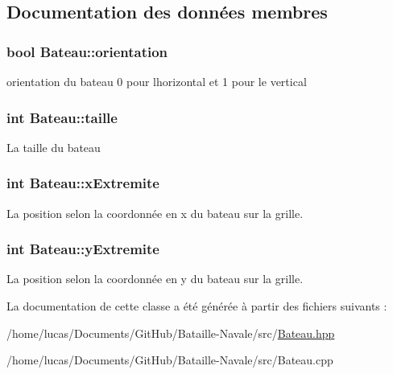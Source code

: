 \subsection{Documentation des données membres}
\subsubsection[{\texorpdfstring{orientation}{orientation}}]{\setlength{\rightskip}{0pt plus 5cm}bool Bateau\+::orientation\hspace{0.3cm}{\ttfamily [private]}}\hypertarget{class_bateau_a2d3074370ff0c372286522f298830f63}{}\label{class_bateau_a2d3074370ff0c372286522f298830f63}
orientation du bateau 0 pour l\textquotesingle{}horizontal et 1 pour le vertical 
\subsubsection[{\texorpdfstring{taille}{taille}}]{\setlength{\rightskip}{0pt plus 5cm}int Bateau\+::taille\hspace{0.3cm}{\ttfamily [private]}}\hypertarget{class_bateau_a1dd818ea44eed67f756400eaac344a95}{}\label{class_bateau_a1dd818ea44eed67f756400eaac344a95}
La taille du bateau 
\subsubsection[{\texorpdfstring{x\+Extremite}{xExtremite}}]{\setlength{\rightskip}{0pt plus 5cm}int Bateau\+::x\+Extremite\hspace{0.3cm}{\ttfamily [private]}}\hypertarget{class_bateau_ab63ce4226907ed0961b47eded901658e}{}\label{class_bateau_ab63ce4226907ed0961b47eded901658e}
La position selon la coordonnée en x du bateau sur la grille. 
\subsubsection[{\texorpdfstring{y\+Extremite}{yExtremite}}]{\setlength{\rightskip}{0pt plus 5cm}int Bateau\+::y\+Extremite\hspace{0.3cm}{\ttfamily [private]}}\hypertarget{class_bateau_a32294182fa76970d9be2c4de5d8329e6}{}\label{class_bateau_a32294182fa76970d9be2c4de5d8329e6}
La position selon la coordonnée en y du bateau sur la grille. 

La documentation de cette classe a été générée à partir des fichiers suivants \+:\begin{DoxyCompactItemize}
\item 
/home/lucas/\+Documents/\+Git\+Hub/\+Bataille-\/\+Navale/src/\hyperlink{_bateau_8hpp}{Bateau.\+hpp}\item 
/home/lucas/\+Documents/\+Git\+Hub/\+Bataille-\/\+Navale/src/Bateau.\+cpp\end{DoxyCompactItemize}
